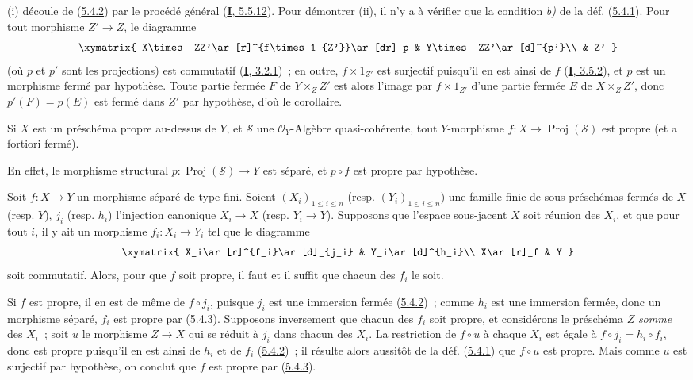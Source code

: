 (i) découle de (\hyperref[II.5.4.2-fr]{5.4.2}) par le procédé général
(\hyperref[I.5.5.12-fr]{\textbf{I}, 5.5.12}). Pour démontrer (ii), il n'y a à
vérifier que la condition \emph{b)} de la déf. (\hyperref[II.5.4.1-fr]{5.4.1}).
Pour tout morphisme $Z'\to Z$, le diagramme
\[
  \xymatrix{
    X\times_ZZ'\ar[r]^{f\times1_{Z'}}\ar[dr]_p &
    Y\times_ZZ'\ar[d]^{p'}\\
    & Z'
  }
\]
(où $p$ et $p'$ sont les projections) est commutatif
(\hyperref[I.3.2.1-fr]{\textbf{I}, 3.2.1})~; en outre, $f\times1_{Z'}$ est surjectif
puisqu'il en est ainsi de $f$ (\hyperref[I.3.5.2-fr]{\textbf{I}, 3.5.2}), et $p$ est
un morphisme fermé par hypothèse. Toute partie fermée $F$ de
$Y\times_ZZ'$ est alors l'image par $f\times1_{Z'}$ d'une partie fermée $E$
de $X\times_ZZ'$, donc $p'(F)=p(E)$ est fermé dans $Z'$ par hypothèse, d'où
le corollaire.

\begin{corollary}[5.4.4]
\label{II.5.4.4-fr}
Si $X$ est un préschéma propre au-dessus de $Y$, et $\mathcal{S}$ une
$\mathcal{O}_Y$-Algèbre quasi-cohérente, tout $Y$-morphisme
$f:X\to\operatorname{Proj}(\mathcal{S})$ est propre (et \textup{a fortiori} fermé).
\end{corollary}

En effet, le morphisme structural
$p:\operatorname{Proj}(\mathcal{S})\to Y$ est séparé, et $p\circ f$ est
propre par hypothèse.

\begin{corollary}[5.4.5]
\label{II.5.4.5-fr}
Soit $f:X\to Y$ un morphisme séparé de type fini. Soient
$(X_i)_{1\leq i\leq n}$ \textup{(resp. $(Y_i)_{1\leq i\leq n}$)} une famille finie
de sous-préschémas fermés de $X$ \textup{(resp. $Y$)}, $j_i$ \textup{(resp. $h_i$)}
l'injection canonique $X_i\to X$ \textup{(resp. $Y_i\to Y$)}. Supposons que l'espace
sous-jacent $X$ soit réunion des $X_i$, et que pour tout $i$, il y ait un
morphisme $f_i:X_i\to Y_i$ tel que le diagramme
\[
  \xymatrix{
    X_i\ar[r]^{f_i}\ar[d]_{j_i} & Y_i\ar[d]^{h_i}\\
    X\ar[r]_f & Y
  }
\]
soit commutatif. Alors, pour que $f$ soit propre, il faut et il suffit que
chacun des $f_i$ le soit.
\end{corollary}


Si $f$ est propre, il en est de même de $f\circ j_i$, puisque $j_i$ est une
immersion fermée (\hyperref[II.5.4.2-fr]{5.4.2})~; comme $h_i$ est une
immersion fermée, donc un morphisme séparé, $f_i$ est propre par
(\hyperref[II.5.4.3-fr]{5.4.3}). Supposons inversement que chacun des $f_i$
soit propre, et considérons le préschéma $Z$ \emph{somme} des $X_i$~; soit $u$ le
morphisme $Z\to X$ qui se réduit à $j_i$ dans chacun des $X_i$. La
restriction de $f\circ u$ à chaque $X_i$ est égale à
$f\circ j_i=h_i\circ f_i$, donc est propre puisqu'il en est ainsi de $h_i$
et de $f_i$ (\hyperref[II.5.4.2-fr]{5.4.2})~; il résulte alors aussitôt de
la déf. (\hyperref[II.5.4.1-fr]{5.4.1}) que $f\circ u$ est propre. Mais
comme $u$ est surjectif par hypothèse, on conclut que $f$ est propre par
(\hyperref[II.5.4.3-fr]{5.4.3}).

